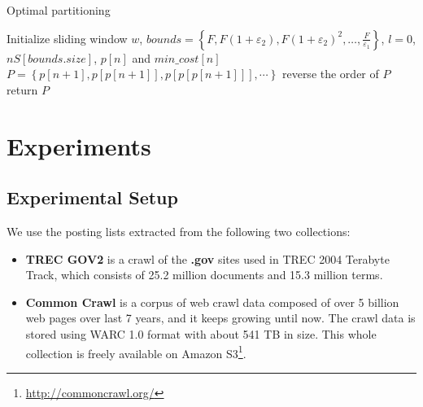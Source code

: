 \documentclass[runningheads]{comsis2}
\begin{document}
\begin{algorithm} \label{alg:optimal partition}
	\caption{Optimal partitioning}
	Initialize sliding window $ w $, $ bounds=\left\lbrace F, F(1+\varepsilon_2), F(1+\varepsilon_2)^2,\dots, \frac{F}{\varepsilon_1} \right\rbrace $, $ l=0 $, $ nS[bounds.size] $, $p\left[ n \right]$ and $min\_cost \left[n\right] $\;
	$ P=\left\lbrace p\left[n+1\right], p\left[p\left[n+1\right]\right], p\left[p\left[p\left[n+1\right]\right]\right],\cdots\right\rbrace $\;
	reverse the order of $ P $\;
	return $ P $\;
\end{algorithm}

\section{Experiments}\label{sec:experiments}
\subsection{Experimental Setup}

We use the posting lists extracted from the following two collections:
\begin{itemize}
	\item \textbf{TREC GOV2} is a crawl of the \textbf{.gov} sites used in TREC 2004 Terabyte Track, which consists of 25.2 million documents and 15.3 million terms.
	\item \textbf{Common Crawl} is a corpus of web crawl data composed of over 5 billion web pages over last 7 years, and it keeps growing until now.
	The crawl data is stored using WARC 1.0 format with about 541 TB in size.
	This whole collection is freely available on Amazon S3\footnote{\url{http://commoncrawl.org/}}.
\end{itemize}
\end{document}

